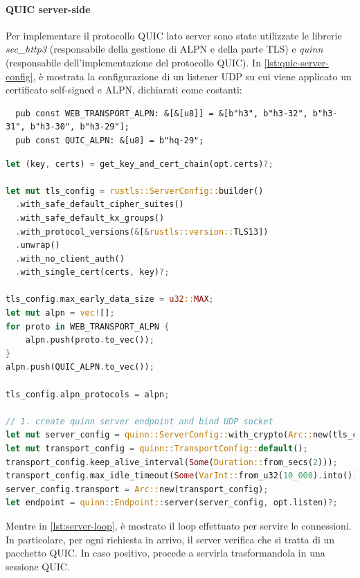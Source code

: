 \documentclass{article}
\begin{document}
\paragraph{QUIC server-side} Per implementare il protocollo QUIC lato server sono state 
utilizzate le librerie \textit{sec\_http3} (responsabile della gestione di ALPN e della 
parte TLS) e \textit{quinn} (responsabile dell'implementazione del protocollo QUIC).
In \cref{lst:quic-server-config}, è mostrata la configurazione di un listener UDP su cui viene applicato un 
certificato self-signed e ALPN, dichiarati come costanti:

\begin{verbatim}
  pub const WEB_TRANSPORT_ALPN: &[&[u8]] = &[b"h3", b"h3-32", b"h3-31", b"h3-30", b"h3-29"];
  pub const QUIC_ALPN: &[u8] = b"hq-29";
\end{verbatim}

\begin{lstlisting}[language=Rust, style=boxed, label={lst:quic-server-config}, captionpos=b,caption={Configurazione del server QUIC}]
let (key, certs) = get_key_and_cert_chain(opt.certs)?;

let mut tls_config = rustls::ServerConfig::builder()
  .with_safe_default_cipher_suites()
  .with_safe_default_kx_groups()
  .with_protocol_versions(&[&rustls::version::TLS13])
  .unwrap()
  .with_no_client_auth()
  .with_single_cert(certs, key)?;

tls_config.max_early_data_size = u32::MAX;
let mut alpn = vec![];
for proto in WEB_TRANSPORT_ALPN {
    alpn.push(proto.to_vec());
}
alpn.push(QUIC_ALPN.to_vec());

tls_config.alpn_protocols = alpn;

// 1. create quinn server endpoint and bind UDP socket
let mut server_config = quinn::ServerConfig::with_crypto(Arc::new(tls_config));
let mut transport_config = quinn::TransportConfig::default();
transport_config.keep_alive_interval(Some(Duration::from_secs(2)));
transport_config.max_idle_timeout(Some(VarInt::from_u32(10_000).into()));
server_config.transport = Arc::new(transport_config);
let endpoint = quinn::Endpoint::server(server_config, opt.listen)?;

\end{lstlisting}
Mentre in \cref{lst:server-loop}, è mostrato il loop effettuato per servire le connessioni. In particolare,
per ogni richiesta in arrivo, il server verifica che si tratta di un pacchetto QUIC. In 
caso positivo, procede a servirla trasformandola in una sessione QUIC.
\end{document}
